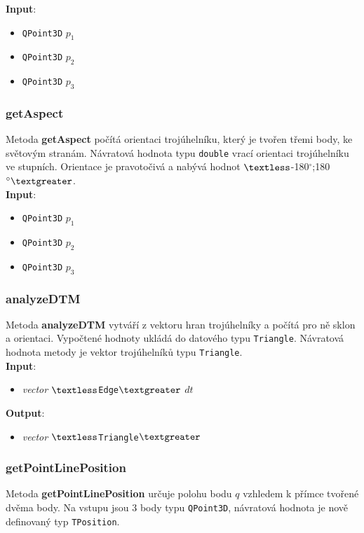 \documentclass[a4paper, 12pt]{article}
\begin{document}
\textbf{Input}:
\begin{itemize}
\item \texttt{QPoint3D} $p_1$
\item \texttt{QPoint3D} $p_2$
\item \texttt{QPoint3D} $p_3$
\end{itemize}

\subsubsection*{getAspect}
Metoda \textbf{getAspect} počítá orientaci trojúhelníku, který je tvořen třemi body, ke světovým stranám. Návratová hodnota typu \texttt{double} vrací orientaci trojúhelníku ve stupních. Orientace je pravotočivá a nabývá hodnot $\textless$-180$^\circ$;180$^\circ\textgreater$.\\

\textbf{Input}:
\begin{itemize}
\item \texttt{QPoint3D} $p_1$
\item \texttt{QPoint3D} $p_2$
\item \texttt{QPoint3D} $p_3$
\end{itemize}

\subsubsection*{analyzeDTM}
Metoda \textbf{analyzeDTM} vytváří z vektoru hran trojúhelníky a počítá pro ně sklon a orientaci. Vypočtené hodnoty ukládá do datového typu \texttt{Triangle}. Návratová hodnota metody je vektor trojúhelníků typu \texttt{Triangle}.\\

\textbf{Input}:
\begin{itemize}
\item \textsl{vector} $\textless$\texttt{Edge}$\textgreater$ $dt$
\end{itemize}

\textbf{Output}:
\begin{itemize}
\item \textsl{vector} $\textless$\texttt{Triangle}$\textgreater$
\end{itemize}

\subsubsection*{getPointLinePosition}
Metoda \textbf{getPointLinePosition} určuje polohu bodu $q$ vzhledem k přímce tvořené dvěma body. Na vstupu jsou 3 body typu \texttt{QPoint3D}, návratová hodnota je nově definovaný typ \texttt{TPosition}.\\
\end{document}
